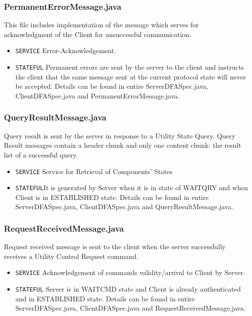 \documentclass[12pt]{usenixsubmit}
\begin{document}
     \subsubsection{PermanentErrorMessage.java}This file includes implementation of the message which serves for acknowledgment of the Client for unsuccessful communication.
     \begin{itemize}
     \item {\tt SERVICE}  Error-Acknowledgement.
     \item {\tt STATEFUL} Permanent errors are sent by the server to the client and instructs the client that the same message sent at the current protocol state will never be accepted. Details can be found in entire ServerDFASpec.java, ClientDFASpec.java and PermanentErrorMessage.java.
     \end{itemize}

     \subsubsection{QueryResultMessage.java}Query result is sent by the server in response to a Utility State Query. Query Result messages contain a header chunk and only one content chunk: the result list of a successful query.
     \begin{itemize}
     \item {\tt SERVICE} Service for Retrieval of Components' States  
     \item {\tt STATEFUL}It is generated by Server when it is in state of WAITQRY and when Client is in ESTABLISHED state. Details can be found in entire ServerDFASpec.java, ClientDFASpec.java and QueryResultMessage.java.
     \end{itemize}

     \subsubsection{RequestReceivedMessage.java}Request received message is sent to the client when the server successfully receives a Utility Control Request command.
     \begin{itemize}
     \item {\tt SERVICE}  Acknowledgement of commands validity/arrival to Client by Server.
     \item {\tt STATEFUL} Server is in WAITCMD state and Client is already authenticated and in ESTABLISHED state. Details can be found in entire ServerDFASpec.java, ClientDFASpec.java and RequestReceivedMessage.java.
     \end{itemize}
\end{document}
